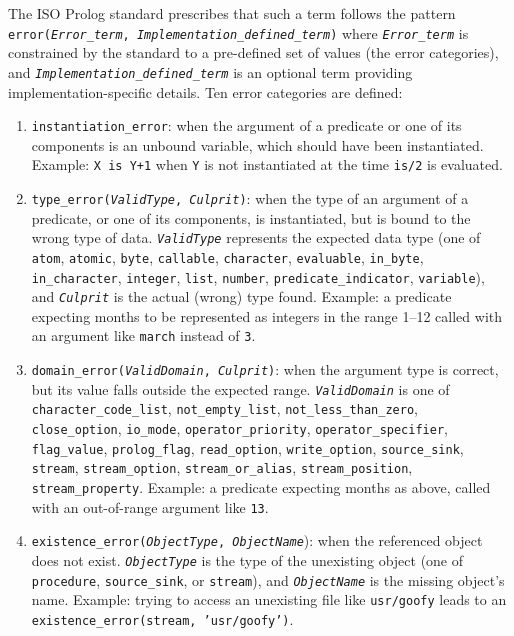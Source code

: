 The ISO Prolog standard prescribes that such a term follows the pattern
\texttt{error(\textit{Error\_term}, \textit{Implementation\_defined\_term})} where
\texttt{\textit{Error\_term}} is constrained by the standard to a pre-defined set of values (the error categories), and \texttt{\textit{Implementation\_defined\_term}} is an optional term providing implementation-specific details.
%
Ten error categories are defined:
\begin{enumerate}
  \item \texttt{instantiation\_error}: when the argument of a predicate or one of its components is an unbound variable, which should have been instantiated. Example: \texttt{X is Y+1} when \texttt{Y} is not instantiated at the time \texttt{is/2} is evaluated.

  \item \texttt{type\_error(\textit{ValidType}, \textit{Culprit})}: when the type of an argument of a predicate, or one of its components, is instantiated, but is bound to the wrong type of data. \texttt{\textit{ValidType}} represents the expected data type (one of \texttt{atom}, \texttt{atomic}, \texttt{byte}, \texttt{callable}, \texttt{character}, \texttt{evaluable}, \texttt{in\_byte}, \texttt{in\_character}, \texttt{integer}, \texttt{list}, \texttt{number}, \texttt{predicate\_indicator}, \texttt{variable}), and \texttt{\textit{Culprit}} is the actual (wrong) type found.
      Example: a predicate expecting months to be represented as integers in the range 1--12 called with an argument like \texttt{march} instead of \texttt{3}.

  \item \texttt{domain\_error(\textit{ValidDomain}, \textit{Culprit})}: when the argument type is correct, but its value falls outside the expected range.
      \texttt{\textit{ValidDomain}} is one of \texttt{character\_code\_list},
      \texttt{not\_empty\_list}, \texttt{not\_less\_than\_zero}, \texttt{close\_option}, \texttt{io\_mode}, \texttt{operator\_priority}, \texttt{operator\_specifier}, \texttt{flag\_value}, \texttt{prolog\_flag}, \texttt{read\_option}, \texttt{write\_option}, \texttt{source\_sink}, \texttt{stream}, \texttt{stream\_option}, \texttt{stream\_or\_alias}, \texttt{stream\_position},\\
      \texttt{stream\_property}. Example: a predicate expecting months as above, called with an out-of-range argument like \texttt{13}.

  \item \texttt{existence\_error(\textit{ObjectType}, \textit{ObjectName}}): when the referenced object does not exist. \texttt{\textit{ObjectType}} is
      the type of the unexisting object (one of \texttt{procedure}, \texttt{source\_sink}, or \texttt{stream}), and \texttt{\textit{ObjectName}} is the missing object's name. Example: trying to access an unexisting file like \texttt{usr/goofy} leads to an
      \texttt{existence\_error(stream, 'usr/goofy')}.


\end{enumerate}
